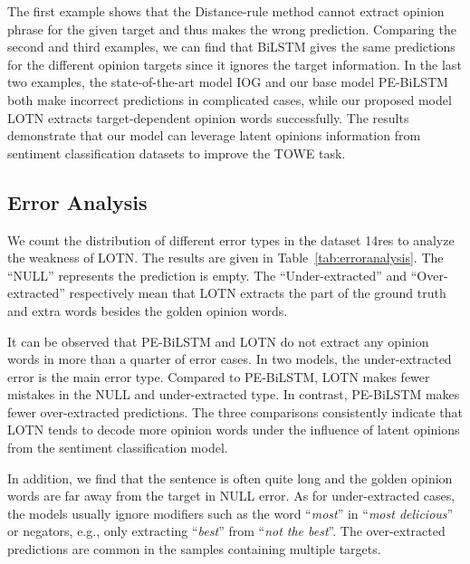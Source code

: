 \documentclass[letterpaper]{article} \usepackage{aaai20}  \usepackage{times}  \usepackage{helvet} \usepackage{courier}  \usepackage[hyphens]{url}  \usepackage{graphicx} \urlstyle{rm} \def\UrlFont{\rm}  \usepackage{graphicx}
\begin{document}
The first example shows that the Distance-rule method cannot extract opinion phrase for the given target and thus makes the wrong prediction. Comparing the second and third examples, we can find that BiLSTM gives the same predictions for the different opinion targets since it ignores the target information. In the last two examples, the state-of-the-art model IOG and our base model PE-BiLSTM both make incorrect predictions in complicated cases, while our proposed model LOTN extracts target-dependent opinion words successfully. The results demonstrate that our model can leverage latent opinions information from sentiment classification datasets to improve the TOWE task.

\subsection{Error Analysis}
We count the distribution of different error types in the dataset 14res to analyze the weakness of LOTN. The results are given in Table~\ref{tab:erroranalysis}. The ``NULL'' represents the prediction is empty. The ``Under-extracted'' and ``Over-extracted'' respectively mean that LOTN extracts the part of the ground truth and extra words besides the golden opinion words.
\begin{table}[!htp]
	\centering
	\caption{Statistics of different error types for PE-BiLSTM and LOTN in the dataset 14res.}
	\label{tab:erroranalysis}
\end{table}

It can be observed that PE-BiLSTM and LOTN do not extract any opinion words in more than a quarter of error cases. In two models, the under-extracted error is the main error type. Compared to PE-BiLSTM, LOTN makes fewer mistakes in the NULL and under-extracted type. In contrast, PE-BiLSTM makes fewer over-extracted predictions. The three comparisons consistently indicate that LOTN tends to decode more opinion words under the influence of latent opinions from the sentiment classification model.

In addition, we find that the sentence is often quite long and the golden opinion words are far away from the target in NULL error. As for under-extracted cases, the models usually ignore modifiers such as the word ``\emph{most}'' in ``\emph{most delicious}'' or negators, e.g., only extracting ``\emph{best}'' from ``\emph{not the best}''. The over-extracted predictions are common in the samples containing multiple targets.
\end{document}
